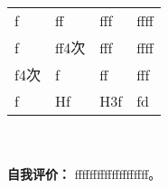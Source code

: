\documentclass{resume}
\begin{document}
\begin{tabularx}{\textwidth}{llll}
f&ff&fff&ffff\\
f&ff4次&fff&ffff\\
f4次&f&ff&fff\\
f&Hf&H3f&fd\\
\end{tabularx}\\\\



{\textbf{自我评价：}}
{ffffffffffffffffffff。}
\end{document}
